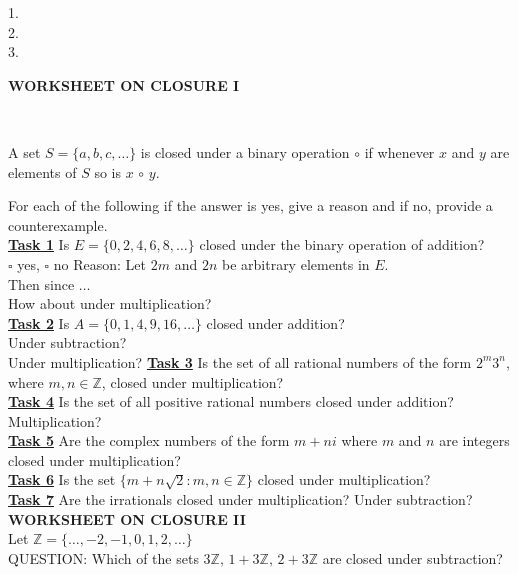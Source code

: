 \documentclass[12pt, fleqn, twoside]{book}
\makeatletter
\def\cleardoublepage{\clearpage\if@twoside \ifodd\c@page\else
   \hbox{}\thispagestyle{empty}\newpage\if@twocolumn\hbox{}\newpage\fi\fi\fi}
\makeatother
\begin{document}
\begin{minipage}{3in}
1.\\[.3in]
2.\\[.3in]
3.\\
\end{minipage}
%
%
%

\cleardoublepage
%
%
%
{\large \bf WORKSHEET ON CLOSURE I}\\[.25in]
\

\qquad A set $S=\{a,b,c,\dots\}$ is closed under a binary operation $\circ$ if whenever $x$ and $y$ are elements of $S$ so is $x\,\circ\,y$.

\qquad For each of the following if the answer is yes, give a reason and if no, provide a counterexample.\\[.25in]
\underline{\bf{Task 1}} Is $E=\{0,2,4,6,8,\dots\}$ closed under the binary operation of addition?\\ [.2in]
{\Huge $\square$} yes, {\Huge$\square$} no \qquad Reason:  Let $2m$ and $2n$ be arbitrary elements in $E$.\\[.15in]
Then since $\dots$\\[1.25in]
How about under multiplication?\\[1.25in]
\underline{\bf{Task 2}} Is $A=\{0,1,4,9,16,\dots\}$ closed under addition?\\[1.25in]
Under subtraction?\\[1.25in]
Under multiplication?%
%
\cleardoublepage%
%
\underline{\bf{Task 3}} Is the set of all rational numbers of the form $2^m3^n$, where $m,n \in \mathbb{Z}$, closed under multiplication?\\[1.5in]
\underline{\bf{Task 4}} Is the set of all positive rational numbers closed under addition?  Multiplication?\\[1.5in]
\underline{\bf{Task 5}} Are the complex numbers of the form $m+ni$ where $m$ and $n$ are integers closed under multiplication?\\[1.5in]
\underline{\bf{Task 6}} Is the set $\{m+n\sqrt{2}: m, n\in \mathbb{Z}\}$ closed under multiplication?\\[1.5in]
\underline{\bf{Task 7}} Are the irrationals closed under multiplication? Under subtraction?
%
%
%
\cleardoublepage%
%
%
%
{\large \bf WORKSHEET ON CLOSURE II}\\[.25in]
Let $\mathbb{Z}=\{\dots, -2, -1, 0, 1, 2, \dots\}$\\
QUESTION: Which of the sets $3\mathbb{Z},\, 1+3\mathbb{Z},\,2+3\mathbb{Z}$ are closed under subtraction?\\[.25in]
\end{document}
